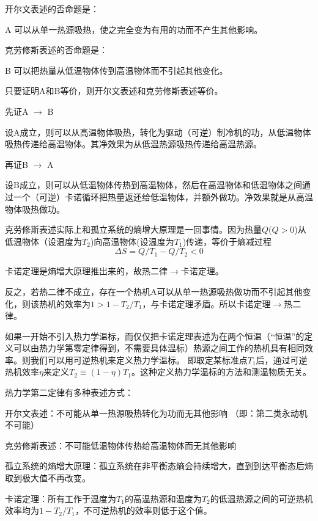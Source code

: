 \documentclass[CJK]{beamer}
\begin{document}
\begin{frame}
\bch
{\small
\bitem
\item{
开尔文表述的否命题是：

A 可以从单一热源吸热，使之完全变为有用的功而不产生其他影响。
}
\item{
克劳修斯表述的否命题是：

B 可以把热量从低温物体传到高温物体而不引起其他变化。
}
\eitem

只要证明A和B等价，则开尔文表述和克劳修斯表述等价。

先证A $\rightarrow$ B

设A成立，则可以从高温物体吸热，转化为驱动（可逆）制冷机的功，从低温物体吸热传递给高温物体。其净效果为从低温热源吸热传递给高温热源。

\skipline

再证B $\rightarrow$ A

设B成立，则可以从低温物体传热到高温物体，然后在高温物体和低温物体之间通过一个（可逆）卡诺循环把热量返还给低温物体，并额外做功。净效果就是从高温物体吸热做功。
}
\ech
\end{frame}

\begin{frame}
\bch
克劳修斯表述实际上和孤立系统的熵增大原理是一回事情。因为热量$Q$($Q>0$)从低温物体（设温度为$T_2$)向高温物体(设温度为$T_1$)传递，等价于熵减过程
$$\Delta S = Q/T_1 - Q/T_2<0$$
\ech
\end{frame}

\begin{frame}
\bch
卡诺定理是熵增大原理推出来的，故热二律$\rightarrow$卡诺定理。

反之，若热二律不成立，存在一个热机A可以从单一热源吸热做功而不引起其他变化，则该热机的效率为$1>1-T_2/T_1$，与卡诺定理矛盾。所以卡诺定理$\rightarrow$热二律。

\ech
\end{frame}

\begin{frame}
\bch
如果一开始不引入热力学温标，而仅仅把卡诺定理表述为在两个恒温（“恒温”的定义可以由热力学第零定律得到，不需要具体温标）热源之间工作的热机具有相同效率。则我们可以用可逆热机来定义热力学温标。
即取定某标准点$T_1$后，通过可逆热机效率$\eta$来定义$T_2 \equiv (1-\eta)T_1$。这种定义热力学温标的方法和测温物质无关。
\ech
\end{frame}

\begin{frame}
\bch
热力学第二定律有多种表述方式：
\bitem
\item{开尔文表述：不可能从单一热源吸热转化为功而无其他影响 （即：第二类永动机不可能）}
\item{克劳修斯表述：不可能低温物体传热给高温物体而无其他影响}
\item{孤立系统的熵增大原理：孤立系统在非平衡态熵会持续增大，直到到达平衡态后熵取到极大值不再改变。}
\item{卡诺定理：所有工作于温度为$T_1$的高温热源和温度为$T_2$的低温热源之间的可逆热机效率均为$1-T_2/T_1$，不可逆热机的效率则低于这个值。}
\eitem
\ech
\end{frame}
\end{document}
